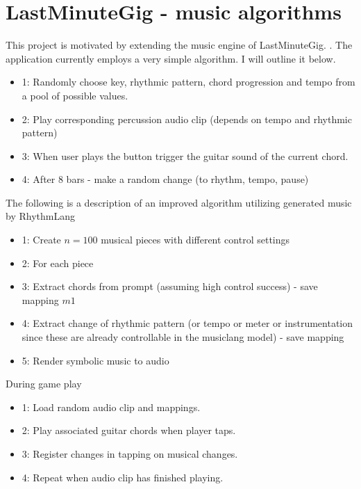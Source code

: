 \section{LastMinuteGig - music algorithms}
This project is motivated by extending the music engine of LastMinuteGig. \cite{Chalkiadakis_2022}. The application currently employs a very simple algorithm. I will outline it below. 
\begin{itemize}
    \item{1}: Randomly choose key, rhythmic pattern, chord progression and tempo from a pool of possible values.
    \item{2}: Play corresponding percussion audio clip (depends on tempo and rhythmic pattern)
    \item{3}: When user plays the button trigger the guitar sound of the current chord.
    \item{4}: After 8 bars - make a random change (to rhythm, tempo, pause)
\end{itemize}


The following is a description of an improved algorithm utilizing generated music by RhythmLang
\begin{itemize}
    \item{1}: Create $n=100$ musical pieces with different control settings
    \item{2}: For each piece
    \item{3}: Extract chords from prompt (assuming high control success) - save mapping $m1$
    \item{4}: Extract change of rhythmic pattern (or tempo or meter or instrumentation since these are already controllable in the musiclang model) - save mapping
    \item{5}: Render symbolic music to audio
\end{itemize}

During game play
\begin{itemize}
    \item{1}: Load random audio clip and mappings.
    \item{2}: Play associated guitar chords when player taps.
    \item{3}: Register changes in tapping on musical changes.
    \item{4}: Repeat when audio clip has finished playing.
\end{itemize}

